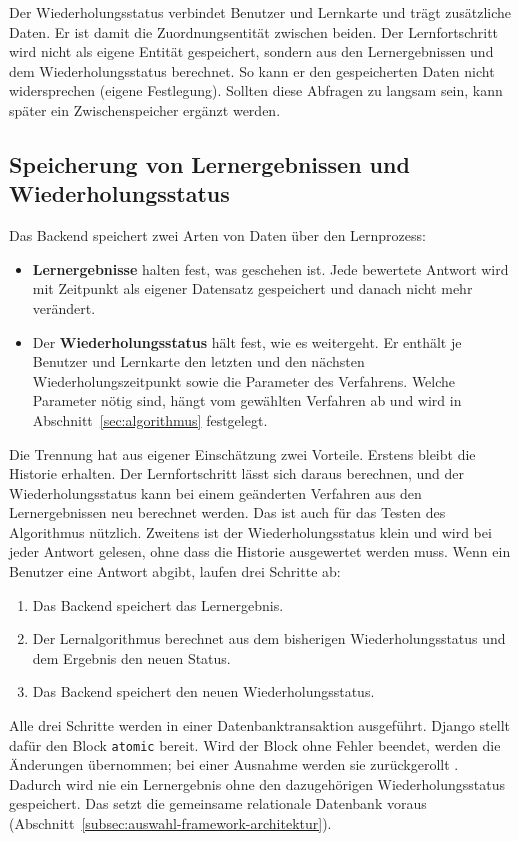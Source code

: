 Der Wiederholungsstatus verbindet Benutzer und Lernkarte und trägt zusätzliche Daten. Er ist damit die Zuordnungsentität zwischen beiden. Der Lernfortschritt wird nicht als eigene Entität gespeichert, sondern aus den Lernergebnissen und dem Wiederholungsstatus berechnet. So kann er den gespeicherten Daten nicht widersprechen (eigene Festlegung). Sollten diese Abfragen zu langsam sein, kann später ein Zwischenspeicher ergänzt werden.

\subsection{Speicherung von Lernergebnissen und Wiederholungsstatus}
\label{subsec:ergebnisse-speichern}
Das Backend speichert zwei Arten von Daten über den Lernprozess:
\begin{itemize}
    \item \textbf{Lernergebnisse} halten fest, was geschehen ist. Jede bewertete Antwort wird mit Zeitpunkt als eigener Datensatz gespeichert und danach nicht mehr verändert.
    \item Der \textbf{Wiederholungsstatus} hält fest, wie es weitergeht. Er enthält je Benutzer und Lernkarte den letzten und den nächsten Wiederholungszeitpunkt sowie die Parameter des Verfahrens. Welche Parameter nötig sind, hängt vom gewählten Verfahren ab und wird in Abschnitt~\ref{sec:algorithmus} festgelegt.
\end{itemize}
Die Trennung hat aus eigener Einschätzung zwei Vorteile. Erstens bleibt die Historie erhalten. Der Lernfortschritt lässt sich daraus berechnen, und der Wiederholungsstatus kann bei einem geänderten Verfahren aus den Lernergebnissen neu berechnet werden. Das ist auch für das Testen des Algorithmus nützlich. Zweitens ist der Wiederholungsstatus klein und wird bei jeder Antwort gelesen, ohne dass die Historie ausgewertet werden muss.
Wenn ein Benutzer eine Antwort abgibt, laufen drei Schritte ab:
\begin{enumerate}
    \item Das Backend speichert das Lernergebnis.
    \item Der Lernalgorithmus berechnet aus dem bisherigen Wiederholungsstatus und dem Ergebnis den neuen Status.
    \item Das Backend speichert den neuen Wiederholungsstatus.
\end{enumerate}
Alle drei Schritte werden in einer Datenbanktransaktion ausgeführt. Django stellt dafür den Block \texttt{atomic} bereit. Wird der Block ohne Fehler beendet, werden die Änderungen übernommen; bei einer Ausnahme werden sie zurückgerollt \parencite{djangoTransactions}. Dadurch wird nie ein Lernergebnis ohne den dazugehörigen Wiederholungsstatus gespeichert. Das setzt die gemeinsame relationale Datenbank voraus (Abschnitt~\ref{subsec:auswahl-framework-architektur}).
